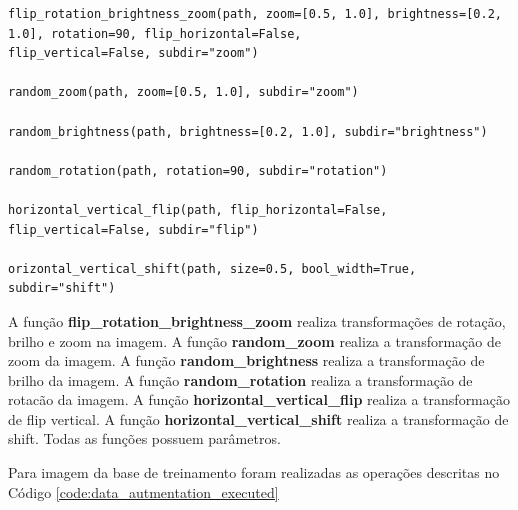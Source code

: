 \documentclass[12pt]{article}
\begin{document}
\begin{lstlisting}[caption={Funções de Transformação das Imagens},captionpos=b,frame=single,label={code:data_autmentation}]
flip_rotation_brightness_zoom(path, zoom=[0.5, 1.0], brightness=[0.2, 1.0], rotation=90, flip_horizontal=False,
flip_vertical=False, subdir="zoom")

random_zoom(path, zoom=[0.5, 1.0], subdir="zoom")

random_brightness(path, brightness=[0.2, 1.0], subdir="brightness")

random_rotation(path, rotation=90, subdir="rotation")

horizontal_vertical_flip(path, flip_horizontal=False, flip_vertical=False, subdir="flip")

orizontal_vertical_shift(path, size=0.5, bool_width=True, subdir="shift")
\end{lstlisting}

A função \textbf{flip\_rotation\_brightness\_zoom} realiza transformações de rotação, brilho e zoom na imagem. A função \textbf{random\_zoom} realiza a transformação de zoom da imagem. A função \textbf{random\_brightness} realiza a transformação de brilho da imagem. A função \textbf{random\_rotation} realiza a transformação de rotacão da imagem. A função \textbf{horizontal\_vertical\_flip} realiza a transformação de flip vertical. A função \textbf{horizontal\_vertical\_shift} realiza a transformação de shift. Todas as funções possuem parâmetros.

Para imagem da base de treinamento foram realizadas as operações descritas no Código \ref{code:data_autmentation_executed}
\end{document}
